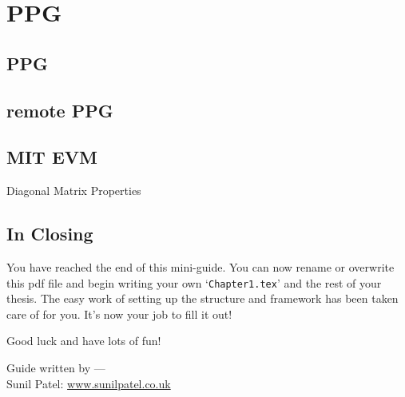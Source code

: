 \chapter{PPG} %

\label{Chapter6} %


\section{PPG}
\section{remote PPG}
\section{MIT EVM}
\begin{compactitem}

\item Diagonal Matrix Properties
\end{compactitem}


\section{In Closing}

You have reached the end of this mini-guide. You can now rename or overwrite this pdf file and begin writing your own `\texttt{Chapter1.tex}' and the rest of your thesis. The easy work of setting up the structure and framework has been taken care of for you. It's now your job to fill it out!

Good luck and have lots of fun!

\begin{flushright}
Guide written by ---\\
Sunil Patel: \href{http://www.sunilpatel.co.uk}{www.sunilpatel.co.uk}
\end{flushright}

